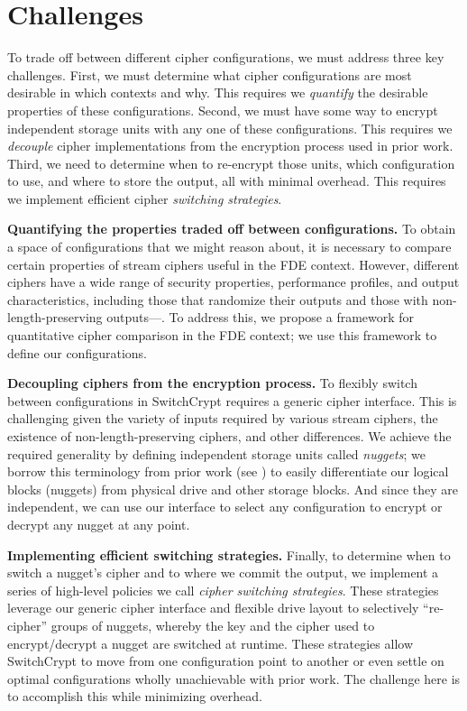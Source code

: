 \section{Challenges}
\label{sec:key-challenges}

To trade off between different cipher configurations, we must address three key
challenges. First, we must determine what cipher configurations are most
desirable in which contexts and why. This requires we \emph{quantify} the
desirable properties of these configurations. Second, we must have some way to
encrypt independent storage units with any one of these configurations. This
requires we \emph{decouple} cipher implementations from the encryption process
used in prior work. Third, we need to determine when to re-encrypt those units,
which configuration to use, and where to store the output, all with minimal
overhead. This requires we implement efficient cipher \emph{switching
strategies}.

\textbf{Quantifying the properties traded off between configurations.} To obtain
a space of configurations that we might reason about, it is necessary to compare
certain properties of stream ciphers useful in the FDE context. However,
different ciphers have a wide range of security properties, performance
profiles, and output characteristics, including those that randomize their
outputs and those with non-length-preserving outputs---. To address this, we propose a framework for
quantitative cipher comparison in the FDE context; we use this framework to
define our configurations.

\textbf{Decoupling ciphers from the encryption process.} To flexibly switch
between configurations in SwitchCrypt requires a generic cipher interface. This
is challenging given the variety of inputs required by various stream ciphers,
the existence of non-length-preserving ciphers, and other differences. We
achieve the required generality by defining independent storage units called
\emph{nuggets}; we borrow this terminology from prior work (see
\cite{StrongBox}) to easily differentiate our logical blocks (nuggets) from
physical drive and other storage blocks. And since they are independent, we can
use our interface to select any configuration to encrypt or decrypt any nugget
at any point.

\textbf{Implementing efficient switching strategies.} Finally, to determine when
to switch a nugget's cipher and to where we commit the output, we implement a
series of high-level policies we call \textit{cipher switching strategies}.
These strategies leverage our generic cipher interface and flexible drive layout
to selectively ``re-cipher'' groups of nuggets, whereby the key and the cipher
used to encrypt/decrypt a nugget are switched at runtime. These strategies allow
SwitchCrypt to move from one configuration point to another or even settle on
optimal configurations wholly unachievable with prior work. The challenge here
is to accomplish this while minimizing overhead.

